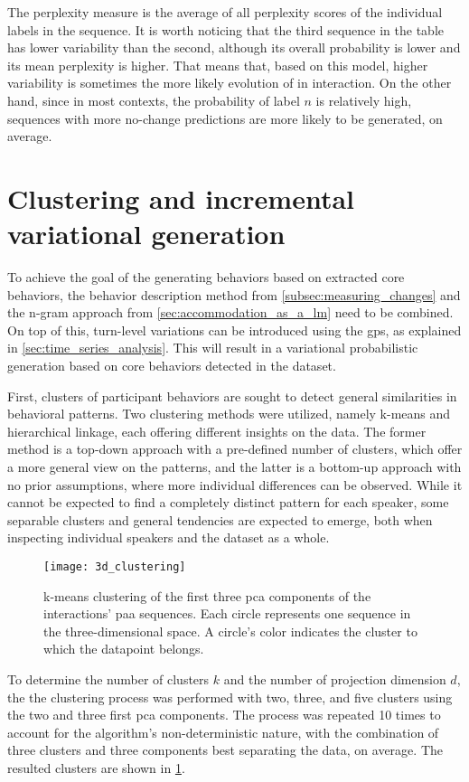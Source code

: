 \noindent
%
The perplexity measure is the average of all perplexity scores of the individual labels in the sequence.
It is worth noticing that the third sequence in the table has lower variability than the second, although its overall probability is lower and its mean perplexity is higher.
That means that, based on this model, higher variability is sometimes the more likely evolution of in interaction.
On the other hand, since in most contexts, the probability of label $n$ is relatively high, sequences with more no-change predictions are more likely to be generated, on average.

\section{Clustering and incremental variational generation}
\label{sec:clustering_and_incremental_generation}

To achieve the goal of the generating behaviors based on extracted core behaviors, the behavior description method from \cref{subsec:measuring_changes} and the n-gram approach from \cref{sec:accommodation_as_a_lm} need to be combined.
On top of this, turn-level variations can be introduced using the \acp{gp}, as explained in \cref{sec:time_series_analysis}.
This will result in a variational probabilistic generation based on core behaviors detected in the dataset.

First, clusters of participant behaviors are sought to detect general similarities in behavioral patterns.
Two clustering methods were utilized, namely k-means and hierarchical linkage, each offering different insights on the data.
The former method is a top-down approach with a pre-defined number of clusters, which offer a more general view on the patterns, and the latter is a bottom-up approach with no prior assumptions, where more individual differences can be observed.
While it cannot be expected to find a completely distinct pattern for each speaker, some separable clusters and general tendencies are expected to emerge, both when inspecting individual speakers and the dataset as a whole.
%
\begin{figure}[t]
	\centering
	\texttt{[image: 3d\_clustering]}
	\caption[3D projections of k-means clustering of accommodation changes \acs{pca} components]
		{k-means clustering of the first three \acs{pca} components of the interactions' \acs{paa} sequences.
		Each circle represents one sequence in the three-dimensional space.
		A circle's color indicates the cluster to which the datapoint belongs.}
	\label{fig:k-means_clustering}
\end{figure}
%
To determine the number of clusters $k$ and the number of projection dimension $d$, the the clustering process was performed with two, three, and five clusters using the two and three first \ac{pca} components.
The process was repeated 10 times to account for the algorithm's non-deterministic nature, with the combination of three clusters and three components best separating the data, on average.
The resulted clusters are shown in \cref{fig:k-means_clustering}.

